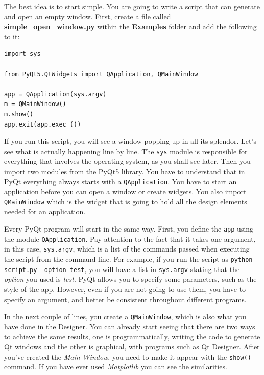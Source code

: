 The best idea is to start simple. You are going to write a script that
can generate and open an empty window. First, create a file called
\textbf{simple\_open\_window.py} within the \textbf{Examples} folder and
add the following to it:

\begin{verbatim}
import sys

from PyQt5.QtWidgets import QApplication, QMainWindow

app = QApplication(sys.argv)
m = QMainWindow()
m.show()
app.exit(app.exec_())
\end{verbatim}

If you run this script, you will see a window popping up in all its
splendor. Let's see what is actually happening line by line. The
\texttt{sys} module is responsible for everything that involves the
operating system, as you shall see later. Then you import two modules
from the PyQt5 library. You have to understand that in PyQt everything
always starts with a \texttt{QApplication}. You have to start an
application before you can open a window or create widgets. You also
import \texttt{QMainWindow} which is the widget that is going to hold
all the design elements needed for an application.

Every PyQt program will start in the same way. First, you define the
\texttt{app} using the module \texttt{QApplication}. Pay attention to
the fact that it takes one argument, in this case, \texttt{sys.argv},
which is a list of the commands passed when executing the script from
the command line. For example, if you run the script as
\texttt{python script.py -option test}, you will have a list in
\texttt{sys.argv} stating that the \emph{option} you used is
\emph{test}. PyQt allows you to specify some parameters, such as the
style of the app. However, even if you are not going to use them, you
have to specify an argument, and better be consistent throughout
different programs.

In the next couple of lines, you create a \texttt{QMainWindow}, which is
also what you have done in the Designer. You can already start seeing
that there are two ways to achieve the same results, one is
programmatically, writing the code to generate Qt windows and the other
is graphical, with programs such as Qt Designer. After you've created
the \emph{Main Window}, you need to make it appear with the
\texttt{show()} command. If you have ever used \emph{Matplotlib} you can
see the similarities.

